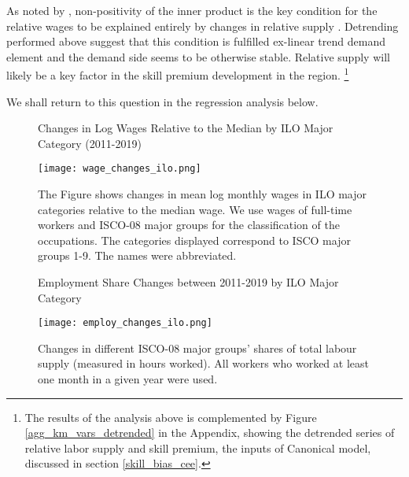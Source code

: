 \documentclass[11pt]{article}
\begin{document}
As noted by \citeauthor{katz1992changes}, non-positivity of the inner product is the key condition for the relative wages to be explained entirely by changes in relative supply . Detrending performed above suggest that this condition is fulfilled ex-linear trend demand element and the demand side seems to be otherwise stable. Relative supply will likely be a key factor in the skill premium development in the region. \footnote{ The results of the analysis above is complemented by Figure \ref{agg_km_vars_detrended} in the Appendix, showing the detrended series of relative labor supply and skill premium, the inputs of Canonical model, discussed in section \ref{skill_bias_cee}. %
}

We shall return to this question in the regression analysis below.




\begin{figure}[!htbp]%
\centering
    \caption{Changes in Log Wages Relative to the Median by ILO Major Category (2011-2019)}
    {\texttt{[image: wage\_changes\_ilo.png]} }
    \caption*{\footnotesize The Figure shows changes in mean log monthly wages in ILO major categories relative to the median wage. We use wages of full-time workers and ISCO-08 major groups for the classification of the occupations. The categories displayed correspond to ISCO major groups 1-9. The names were abbreviated.}
\label{wage_changes_ilo}
\end{figure}


\begin{figure}[!htbp]%
\centering
    \caption{Employment Share Changes between 2011-2019 by ILO Major Category}
    {\texttt{[image: employ\_changes\_ilo.png]} }
    \caption*{\footnotesize Changes in different ISCO-08 major groups' shares of total labour supply (measured in hours worked). All workers who worked at least one month in a given year were used.}
\label{employ_changes_ilo}
\end{figure}
\end{document}

